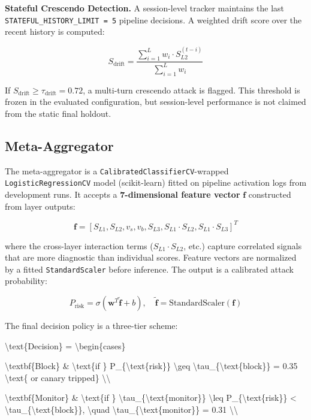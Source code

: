 \documentclass[conference]{IEEEtran}
\begin{document}
\textbf{Stateful Crescendo Detection.} A session-level tracker maintains the last \texttt{STATEFUL\_HISTORY\_LIMIT = 5} pipeline decisions. A weighted drift score over the recent history is computed:


$$S_{\text{drift}} = \frac{\sum_{i=1}^{L} w_i \cdot S_{L2}^{(t-i)}}{\sum_{i=1}^{L} w_i}$$


If $S_{\text{drift}} \geq \tau_{\text{drift}} = 0.72$, a multi-turn crescendo attack is flagged. This threshold is frozen in the evaluated configuration, but session-level performance is not claimed from the static final holdout.


\subsection{Meta-Aggregator}

The meta-aggregator is a \texttt{CalibratedClassifierCV}-wrapped \texttt{LogisticRegressionCV} model (scikit-learn) fitted on pipeline activation logs from development runs. It accepts a \textbf{7-dimensional feature vector} $\mathbf{f}$ constructed from layer outputs:


$$\mathbf{f} = [S_{L1}, S_{L2}, v_s, v_b, S_{L3}, S_{L1} \cdot S_{L2}, S_{L1} \cdot S_{L3}]^T$$


where the cross-layer interaction terms ($S_{L1} \cdot S_{L2}$, etc.) capture correlated signals that are more diagnostic than individual scores. Feature vectors are normalized by a fitted \texttt{StandardScaler} before inference. The output is a calibrated attack probability:


$$P_{\text{risk}} = \sigma\!\left(\mathbf{w}^T \tilde{\mathbf{f}} + b\right), \quad \tilde{\mathbf{f}} = \text{StandardScaler}(\mathbf{f})$$


The final decision policy is a three-tier scheme:


$$\textbackslash{}text\{Decision\} = \textbackslash{}begin\{cases\}

\textbackslash{}textbf\{Block\} \& \textbackslash{}text\{if \} P\_\{\textbackslash{}text\{risk\}\} \textbackslash{}geq \textbackslash{}tau\_\{\textbackslash{}text\{block\}\} = 0.35 \textbackslash{}text\{ or canary tripped\} \textbackslash{}\textbackslash{}

\textbackslash{}textbf\{Monitor\} \& \textbackslash{}text\{if \} \textbackslash{}tau\_\{\textbackslash{}text\{monitor\}\} \textbackslash{}leq P\_\{\textbackslash{}text\{risk\}\} < \textbackslash{}tau\_\{\textbackslash{}text\{block\}\}, \textbackslash{}quad \textbackslash{}tau\_\{\textbackslash{}text\{monitor\}\} = 0.31 \textbackslash{}\textbackslash{}
\end{document}
